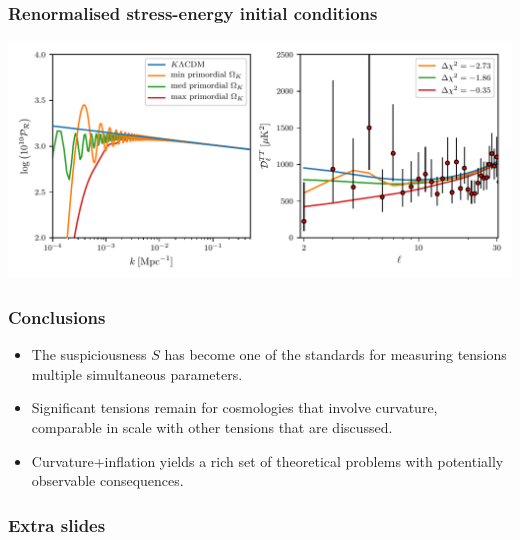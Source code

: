 \documentclass[%
]{beamer}
\begin{document}
\begin{frame}
    \frametitle{Renormalised stress-energy initial conditions}
    \includegraphics[width=\textwidth]{figures/RST.pdf}
\end{frame}


\begin{frame}
    \frametitle{Conclusions}
    \begin{itemize}
        \item The suspiciousness $S$ has become one of the standards for measuring tensions multiple simultaneous parameters.
        \item Significant tensions remain for cosmologies that involve curvature, comparable in scale with other tensions that are discussed.
        \item Curvature+inflation yields a rich set of theoretical problems with potentially observable consequences.
    \end{itemize}
\end{frame}

\begin{frame}
    \frametitle{Extra slides}
\end{frame}
\end{document}

